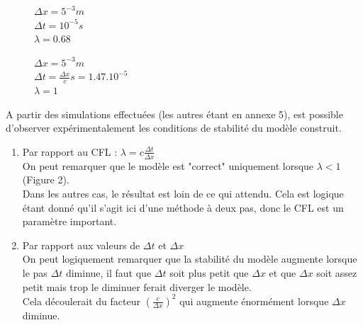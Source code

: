     
\begin{figure}[H]
\begin{minipage}[b]{.46\linewidth}
\centering{}
\caption{
        $\Delta x= 5^{-3}m $\\
        $\Delta t= 10^{-4}s$\\
        $\lambda = 6.8$
    \label{fig1}
    }
\end{minipage} \hfill
\begin{minipage}[b]{.46\linewidth}
\centering{}
\caption{$\Delta x= 5^{-3}m $\\ 
        $\Delta t= 10^{-5}s$\\
        $\lambda = 0.68$
        \label{fig2}}
\end{minipage}
\end{figure}

\begin{figure}[H]
\begin{minipage}[b]{.46\linewidth}
\centering{}
\caption{$\Delta x= 5^{-2}m $\\ 
        $\Delta t= 10^{-6}s$\\
        $\lambda = 0.0068$
        \label{fig1}}
\end{minipage} \hfill
\begin{minipage}[b]{.46\linewidth}
\centering{}
\caption{$\Delta x= 5^{-3} m $\\ 
        $\Delta t= \frac{\Delta x}{c}s= 1.47.10^{-5} $\\
        $\lambda = 1$
        \label{fig2}}
\end{minipage}
\end{figure}


A partir des simulations effectuées (les autres étant en annexe 5), est possible d'observer expérimentalement les conditions de stabilité du modèle construit.
\begin{enumerate}
    \item Par rapport au CFL : $\lambda = c\frac{\Delta t}{\Delta x}$\\
    On peut remarquer que le modèle est "correct" uniquement lorsque $\lambda < 1 $  (Figure 2).\\
    Dans les autres cas, le résultat est loin de ce qui attendu. Cela est logique étant donné qu'il s'agit ici d'une méthode à deux pas, donc le CFL est un paramètre important.
    \item Par rapport aux valeurs  de $\Delta t$ et $\Delta x$ \\
    On peut logiquement remarquer que la stabilité du modèle augmente lorsque le pas $\Delta t$ diminue, il faut que $\Delta t$ soit plus petit que $\Delta x$ et que $\Delta x$ soit assez petit mais trop le diminuer ferait diverger le modèle.\\
    Cela découlerait du facteur $(\frac{c}{\Delta x})^2$ qui augmente énormément lorsque $\Delta x$ diminue.
    
\end{enumerate}


